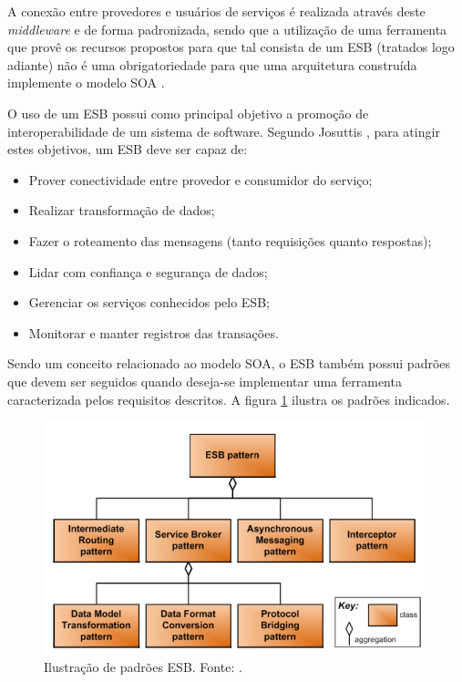 A conexão entre provedores e usuários de serviços é realizada através deste \textit{middleware} e de forma padronizada, sendo que a utilização de uma ferramenta que provê os recursos propostos para que tal consista de um ESB (tratados logo adiante) não é uma obrigatoriedade para que uma arquitetura construída implemente o modelo SOA \cite{lewis_getting_2010}.

O uso de um ESB possui como principal objetivo a promoção de interoperabilidade de um sistema de software. Segundo Josuttis \cite{josuttis_soa_2007}, para atingir estes objetivos, um ESB deve ser capaz de:

\begin{itemize}
\item Prover conectividade entre provedor e consumidor do serviço;
\item Realizar transformação de dados;
\item Fazer o roteamento das mensagens (tanto requisições quanto respostas);
\item Lidar com confiança e segurança de dados;
\item Gerenciar os serviços conhecidos pelo ESB;
\item Monitorar e manter registros das transações.
\end{itemize}

Sendo um conceito relacionado ao modelo SOA, o ESB também possui padrões que devem ser seguidos quando deseja-se implementar uma ferramenta caracterizada pelos requisitos descritos. A figura \ref{padrao_ESB} ilustra os padrões indicados.

\begin{figure}[htb]
\centering
\includegraphics[scale=0.5]{figuras/padrao_ESB.png}
\caption{Ilustração de padrões ESB. Fonte: \cite{bianco_architecting_2011}.}
\label{padrao_ESB}
\end{figure}

